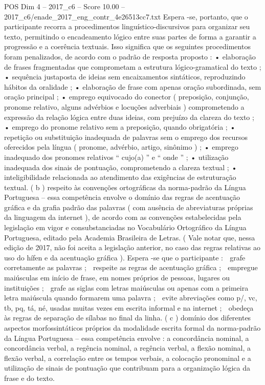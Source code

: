 \begin{textsample}{POS Dim 4 – 2017\_c6 – Score 10.00 – 2017\_c6/enade\_2017\_eng\_contr\_4e26513cc7.txt}
Espera -se, portanto, que o participante recorra a procedimentos linguístico-discursivos para organizar seu texto, permitindo o encadeamento lógico entre suas partes de forma a garantir a progressão e a coerência textuais.
Isso significa que os seguintes procedimentos foram penalizados, de acordo com o padrão de resposta proposto : • elaboração de frases fragmentadas que comprometam a estrutura lógico-gramatical do texto ; • sequência justaposta de ideias sem encaixamentos sintáticos, reproduzindo hábitos da oralidade ; • elaboração de frase com apenas oração subordinada, sem oração principal ; • emprego equivocado do conector ( preposição, conjunção, pronome relativo, alguns advérbios e locuções adverbiais ) comprometendo a expressão da relação lógica entre duas ideias, com prejuízo da clareza do texto ; • emprego do pronome relativo sem a preposição, quando obrigatória ; • repetição ou substituição inadequada de palavras sem o emprego dos recursos oferecidos pela língua ( pronome, advérbio, artigo, sinônimo ) ; • emprego inadequado dos pronomes relativos “ cujo(a) ” e “ onde ” ; • utilização inadequada dos sinais de pontuação, comprometendo a clareza textual ; • inteligibilidade relacionada ao atendimento das exigências de estruturação textual. ( b ) respeito às convenções ortográficas da norma-padrão da Língua Portuguesa – essa competência envolve o domínio das regras de acentuação gráfica e da grafia padrão das palavras ( com ausência de abreviaturas próprias da linguagem da internet ), de acordo com as convenções estabelecidas pela legislação em vigor e consubstanciadas no Vocabulário Ortográfico da Língua Portuguesa, editado pela Academia Brasileira de Letras. ( Vale notar que, nessa edição de 2017, não foi aceita a legislação anterior, no caso das regras relativas ao uso do hífen e da acentuação gráfica ).
Espera -se que o participante :  grafe corretamente as palavras ;  respeite as regras de acentuação gráfica ;  empregue maiúsculas em início de frase, em nomes próprios de pessoas, lugares ou instituições ;  grafe as siglas com letras maiúsculas ou apenas com a primeira letra maiúscula quando formarem uma palavra ;  evite abreviações como p/, vc, tb, pq, tá, né, usadas muitas vezes em escrita informal e na internet ;  obedeça às regras de separação de sílabas no final da linha. ( c ) domínio dos diferentes aspectos morfossintáticos próprios da modalidade escrita formal da norma-padrão da Língua Portuguesa – essa competência envolve : a concordância nominal, a concordância verbal, a regência nominal, a regência verbal, a flexão nominal, a flexão verbal, a correlação entre os tempos verbais, a colocação pronominal e a utilização de sinais de pontuação que contribuam para a organização lógica da frase e do texto.

\end{textsample}
